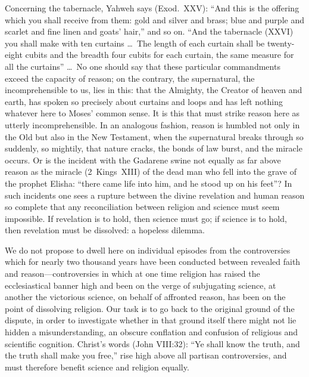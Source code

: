 \documentclass[12pt,a4paper]{article}
\begin{document}
Concerning the tabernacle, Yahweh says (Exod.\ XXV): ``And this is the
offering which you shall receive from them: gold and silver and brass;
blue and purple and scarlet and fine linen and goats' hair,'' and so
on. ``And the tabernacle (XXVI) you shall make with ten curtains
\ldots\ The length of each curtain shall be twenty-eight cubits and
the breadth four cubits for each curtain, the same measure for all the
curtains'' \ldots\ No one should say that these particular commandments
exceed the capacity of reason; on the contrary, the supernatural, the
incomprehensible to us, lies in this: that the Almighty, the Creator
of heaven and earth, has spoken so precisely about curtains and loops
and has left nothing whatever here to Moses' common sense. It is this
that must strike reason here as utterly incomprehensible. In an
analogous fashion, reason is humbled not only in the Old but also in
the New Testament, when the supernatural breaks through so suddenly, so
mightily, that nature cracks, the bonds of law burst, and the miracle
occurs. Or is the incident with the Gadarene swine not equally as far
above reason as the miracle (2~Kings~XIII) of the dead man who fell
into the grave of the prophet Elisha: ``there came life into him, and
he stood up on his feet''? In such incidents one sees a rupture between
the divine revelation and human reason so complete that any
reconciliation between religion and science must seem impossible. If
revelation is to hold, then science must go; if science is to hold,
then revelation must be dissolved: a hopeless dilemma.

We do not propose to dwell here on individual episodes from the
controversies which for nearly two thousand years have been conducted
between revealed faith and reason---controversies in which at one time
religion has raised the ecclesiastical banner high and been on the
verge of subjugating science, at another the victorious science, on
behalf of affronted reason, has been on the point of dissolving
religion. Our task is to go back to the original ground of the dispute,
in order to investigate whether in that ground itself there might not
lie hidden a misunderstanding, an obscure conflation and confusion of
religious and scientific cognition. Christ's words (John VIII:32): ``Ye
shall know the truth, and the truth shall make you free,'' rise high
above all partisan controversies, and must therefore benefit science
and religion equally.
\end{document}
